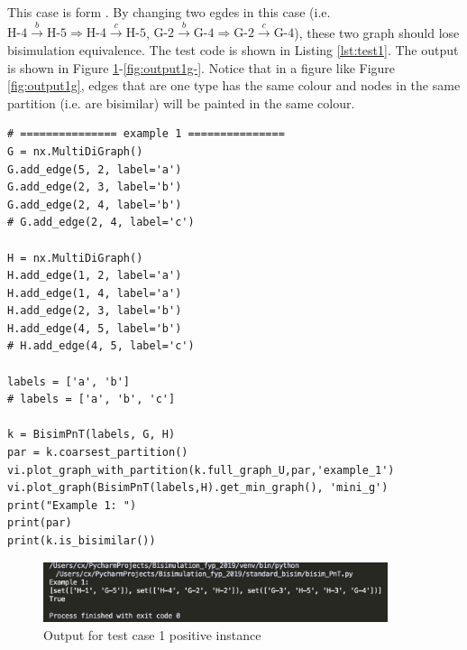 \noindent This case is form \cite{Stirling2011a}. 
By changing two egdes in this case (i.e. $\text{H-4}\stackrel{b}{\rightarrow}\text{H-5} \Longrightarrow \text{H-4}\stackrel{c}{\rightarrow}\text{H-5}$, $\text{G-2}\stackrel{b}{\rightarrow}\text{G-4} \Longrightarrow \text{G-2}\stackrel{c}{\rightarrow}\text{G-4}$), these two graph should lose bisimulation equivalence.
The test code is shown in Listing \ref{lst:test1}.
The output is shown in Figure \ref{fig:output1}-\ref{fig:output1g-}.
Notice that in a figure like Figure \ref{fig:output1g}, edges that are one type has the same colour and nodes in the same partition (i.e. are bisimilar) will be painted in the same colour.
\begin{code}
\caption{Test code for case 1}
\label{lst:test1}
\begin{verbatim}
# =============== example 1 ===============
G = nx.MultiDiGraph()
G.add_edge(5, 2, label='a')
G.add_edge(2, 3, label='b')
G.add_edge(2, 4, label='b')
# G.add_edge(2, 4, label='c')

H = nx.MultiDiGraph()
H.add_edge(1, 2, label='a')
H.add_edge(1, 4, label='a')
H.add_edge(2, 3, label='b')
H.add_edge(4, 5, label='b')
# H.add_edge(4, 5, label='c')

labels = ['a', 'b']
# labels = ['a', 'b', 'c']

k = BisimPnT(labels, G, H)
par = k.coarsest_partition()
vi.plot_graph_with_partition(k.full_graph_U,par,'example_1')
vi.plot_graph(BisimPnT(labels,H).get_min_graph(), 'mini_g')
print("Example 1: ")
print(par)
print(k.is_bisimilar())
\end{verbatim}
\end{code}

\begin{figure}[H]
\centering
\includegraphics[width=0.9\textwidth]{img/output1.png}
\caption{Output for test case 1 positive instance}
\label{fig:output1}
\end{figure}

